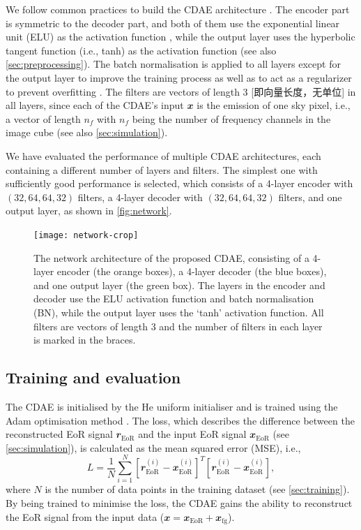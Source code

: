 \documentclass[letters,fleqn,usenatbib,onecolumn]{mnras}
\newcommand{\R}[1]{\mathrm{#1}}
\newcommand{\B}[1]{\mathbfit{#1}}
\begin{document}
We follow common practices to build the CDAE architecture
\citep[e.g.,][]{suganuma2018,geron2017}.
The encoder part is symmetric to the decoder part, and both of them
use the exponential linear unit (ELU) as the activation function
\citep{clevert2016},
while the output layer uses the hyperbolic tangent function (i.e., tanh)
as the activation function (see also \autoref{sec:preprocessing}).
The batch normalisation is applied to all layers except for the output
layer to improve the training process as well as to act as a regularizer
to prevent overfitting \citep{ioffe2015}.
The filters are vectors of length 3 [即向量长度，无单位] in all layers,
since each of the CDAE's input $\B{x}$ is the emission of one sky pixel,
i.e., a vector of length $n_f$ with $n_f$ being the number of frequency
channels in the image cube (see also \autoref{sec:simulation}).

We have evaluated the performance of multiple CDAE architectures, each
containing a different number of layers and filters.
The simplest one with sufficiently good performance is selected,
which consists of a 4-layer encoder with $(32,64,64,32)$ filters,
a 4-layer decoder with $(32,64,64,32)$ filters, and one output layer,
as shown in \autoref{fig:network}.

\begin{figure}
  \centering
  \texttt{[image: network-crop]}
  \caption{\label{fig:network}%
    The network architecture of the proposed CDAE, consisting of a
    4-layer encoder (the orange boxes), a 4-layer decoder (the blue
    boxes), and one output layer (the green box).
    The layers in the encoder and decoder use the ELU activation
    function and batch normalisation (BN), while the output layer uses
    the `tanh' activation function.
    All filters are vectors of length 3 and the number of filters in
    each layer is marked in the braces.
  }
\end{figure}


\subsection{Training and evaluation}
\label{sec:train-eval}

The CDAE is initialised by the He uniform initialiser \citep{he2015}
and is trained using the Adam optimisation method \citep{kingma2015}.
The loss, which describes the difference between the reconstructed EoR
signal $\B{r}_{\R{EoR}}$ and the input EoR signal $\B{x}_{\R{EoR}}$
(see \autoref{sec:simulation}),
is calculated as the mean squared error (MSE), i.e.,
\begin{equation}
  \label{eq:loss}
  L = \frac{1}{N} \sum_{i=1}^{N}
    \left[ \B{r}_{\R{EoR}}^{(i)} - \B{x}_{\R{EoR}}^{(i)} \right]^T
    \left[ \B{r}_{\R{EoR}}^{(i)} - \B{x}_{\R{EoR}}^{(i)} \right],
\end{equation}
where $N$ is the number of data points in the training dataset
(see \autoref{sec:training}).
By being trained to minimise the loss, the CDAE gains the ability to
reconstruct the EoR signal from the input data
($\B{x} = \B{x}_{\R{EoR}} + \B{x}_{\R{fg}}$).
\end{document}
